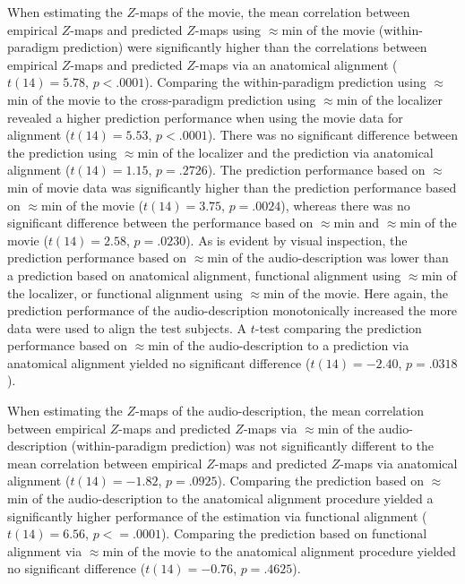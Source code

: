 %
When estimating the $Z$-maps of the movie, the mean correlation between
empirical $Z$-maps and predicted $Z$-maps using $\approx$\unit[15]{min} of the
movie (within-paradigm prediction) were significantly higher than the
correlations between empirical $Z$-maps and predicted $Z$-maps via an anatomical
alignment ($t(14)= 5.78$, $p<.0001$).
%
Comparing the within-paradigm prediction using $\approx$\unit[15]{min} of the
movie to the cross-paradigm prediction using $\approx$\unit[15]{min} of the
localizer revealed a higher prediction performance when using the movie data for
alignment ($t(14)=5.53$, $p<.0001$).
%
There was no significant difference between the prediction using
$\approx$\unit[15]{min} of the localizer and the prediction via anatomical
alignment ($t(14)=1.15$, $p=.2726$).
%
The prediction performance based on $\approx$\unit[30]{min} of movie data was
significantly higher than the prediction performance based on
$\approx$\unit[15]{min} of the movie ($t(14)= 3.75$, $p=.0024$), whereas there
was no significant difference between the performance based on
$\approx$\unit[45]{min} and $\approx$\unit[30]{min} of the movie ($t(14)=2.58$,
$p=.0230$).
%
As is evident by visual inspection, the prediction performance based on
$\approx$\unit[15]{min} of the audio-description was lower than a prediction
based on anatomical alignment, functional alignment using
$\approx$\unit[15]{min} of the localizer, or functional alignment using
$\approx$\unit[15]{min} of the movie.
%
Here again, the prediction performance of the audio-description monotonically
increased the more data were used to align the test subjects.
%
A $t$-test comparing the prediction performance based on
$\approx$\unit[120]{min} of the audio-description to a prediction via anatomical
alignment yielded no significant difference ($t(14)=-2.40$, $p=.0318$).

%
When estimating the $Z$-maps of the audio-description, the mean correlation
between empirical $Z$-maps and predicted $Z$-maps via $\approx$\unit[15]{min} of
the audio-description (within-paradigm prediction) was not significantly
different to the mean correlation between empirical $Z$-maps and predicted
$Z$-maps via anatomical alignment ($t(14)=-1.82$, $p=.0925$).
%
Comparing the prediction based on $\approx$\unit[120]{min} of the
audio-description to the anatomical alignment procedure yielded a significantly
higher performance of the estimation via functional alignment ($t(14)=6.56$,
$p<=.0001$).
%
Comparing the prediction based on functional alignment via
$\approx$\unit[120]{min} of the movie to the anatomical alignment procedure
yielded no significant difference ($t(14)=-0.76$, $p=.4625$).





